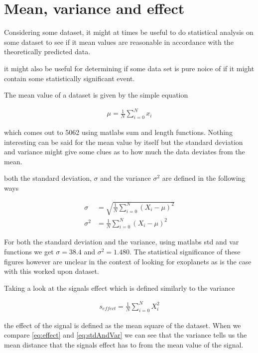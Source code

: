 \section{Mean, variance and effect}
Considering some dataset, it might at times be useful 
to do statistical analysis on some dataset to see
if it mean values are reasonable in accordance with
the theoretically predicted data.\

it might also be useful for determining if some data
set is pure noice of if it might contain some statistically
significant event.

The mean value of a dataset is given by the simple equation

\begin{align}
  \label{mean}
  \mu = \frac{1}{N}\sum_{i=0}^{N} x_{i}
\end{align}

which comes out to 5062 using matlabs sum and length functions.
Nothing interesting can be said for the mean value by itself 
but the standard deviation and variance might give some clues
as to how much the data deviates from the mean.\

both the standard deviation, $\sigma$ and the variance $\sigma^2$
are defined in the following ways

\begin{align}
  \label{eq:stdAndVar}
  \sigma &= \sqrt{\frac{1}{N}\sum_{i=0}^{N}(X_{i} - \mu)^2}\\
  \sigma^2 &= \frac{1}{N}\sum_{i=0}^{N}(X_{i} - \mu)^2
\end{align}

For both the standard deviation and the variance, using matlabs std and var
functions we get $\sigma = 38.4$ and $\sigma^2 = 1.480$. The statistical significance
of these figures however are unclear in the context of looking for exoplanets as 
is the case with this worked upon dataset.

Taking a look at the signals effect which is defined similarly to the variance

\begin{align}
  \label{eq:effect}
  s_{effect} = \frac{1}{N}\sum_{i=0}^N X_{i}^2
\end{align}

the effect of the signal is defined as the mean square of the dataset.
When we compare \eqref{eq:effect} and \eqref{eq:stdAndVar} we can see
that the variance tells us the mean distance that the signals effect has
to from the mean value of the signal.

